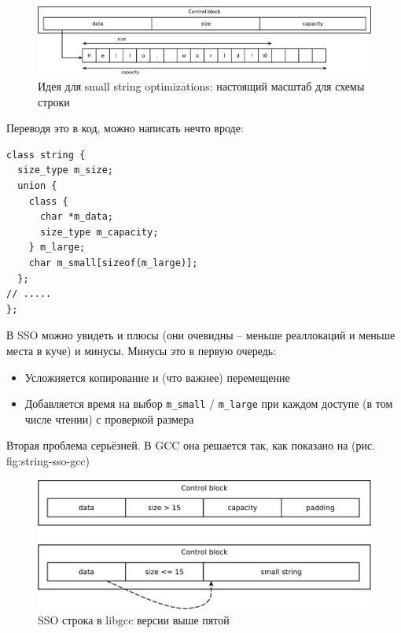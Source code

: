 \documentclass[a4paper,12pt,oneside]{article}
\begin{document}
\begin{figure}[ht]
\centering
\includegraphics[width=1.0\textwidth]{illustrations/string-sso-controlblock-crop.pdf}
\caption{Идея для small string optimizations: настоящий масштаб для схемы строки}
\label{fig:string-sso-controlblock}
\end{figure}

Переводя это в код, можно написать нечто вроде:

\begin{lstlisting}
class string {
  size_type m_size;
  union {
    class {
      char *m_data;
      size_type m_capacity;
    } m_large;
    char m_small[sizeof(m_large)];
  };
// .....
};
\end{lstlisting}

В SSO можно увидеть и плюсы (они очевидны -- меньше реаллокаций и меньше места в куче) и минусы. Минусы это в первую очередь:

\begin{itemize}
\item Усложняется копирование и (что важнее) перемещение
\item  Добавляется время на выбор \lstinline!m_small! / \lstinline!m_large! при каждом доступе (в том числе чтении) с проверкой размера
\end{itemize}

Вторая проблема серьёзней. В GCC она решается так, как показано на (рис. {fig:string-sso-gcc})

\begin{figure}[ht]
\centering
\includegraphics[width=1.0\textwidth]{illustrations/string-sso-gcc-crop.pdf}
\caption{SSO строка в libgcc версии выше пятой}
\label{fig:string-sso-gcc}
\end{figure}
\end{document}

